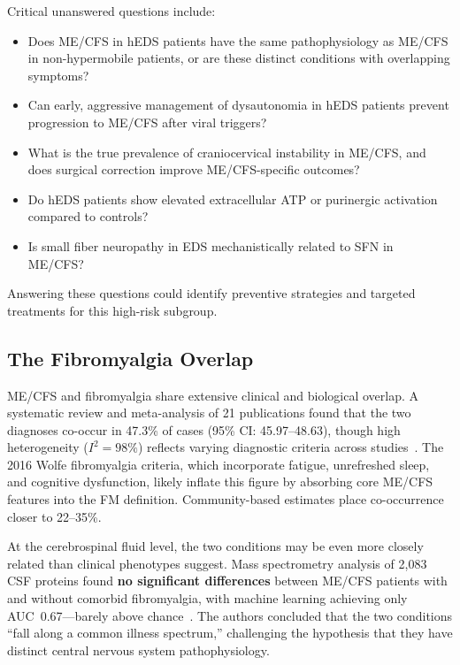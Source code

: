 \begin{open_question}
Critical unanswered questions include:
\begin{itemize}
    \item Does ME/CFS in hEDS patients have the same pathophysiology as ME/CFS in non-hypermobile patients, or are these distinct conditions with overlapping symptoms?
    \item Can early, aggressive management of dysautonomia in hEDS patients prevent progression to ME/CFS after viral triggers?
    \item What is the true prevalence of craniocervical instability in ME/CFS, and does surgical correction improve ME/CFS-specific outcomes?
    \item Do hEDS patients show elevated extracellular ATP or purinergic activation compared to controls?
    \item Is small fiber neuropathy in EDS mechanistically related to SFN in ME/CFS?
\end{itemize}
Answering these questions could identify preventive strategies and targeted treatments for this high-risk subgroup.
\end{open_question}

\subsection{The Fibromyalgia Overlap}

ME/CFS and fibromyalgia share extensive clinical and biological overlap. A systematic review and meta-analysis of 21 publications found that the two diagnoses co-occur in 47.3\% of cases (95\% CI: 45.97--48.63), though high heterogeneity ($I^2=98\%$) reflects varying diagnostic criteria across studies~\cite{RamirezMorales2022overlap}. The 2016 Wolfe fibromyalgia criteria, which incorporate fatigue, unrefreshed sleep, and cognitive dysfunction, likely inflate this figure by absorbing core ME/CFS features into the FM definition. Community-based estimates place co-occurrence closer to 22--35\%.

At the cerebrospinal fluid level, the two conditions may be even more closely related than clinical phenotypes suggest. Mass spectrometry analysis of 2,083 CSF proteins found \textbf{no significant differences} between ME/CFS patients with and without comorbid fibromyalgia, with machine learning achieving only AUC~0.67---barely above chance~\cite{Nilsson2023proteomics}. The authors concluded that the two conditions ``fall along a common illness spectrum,'' challenging the hypothesis that they have distinct central nervous system pathophysiology.

